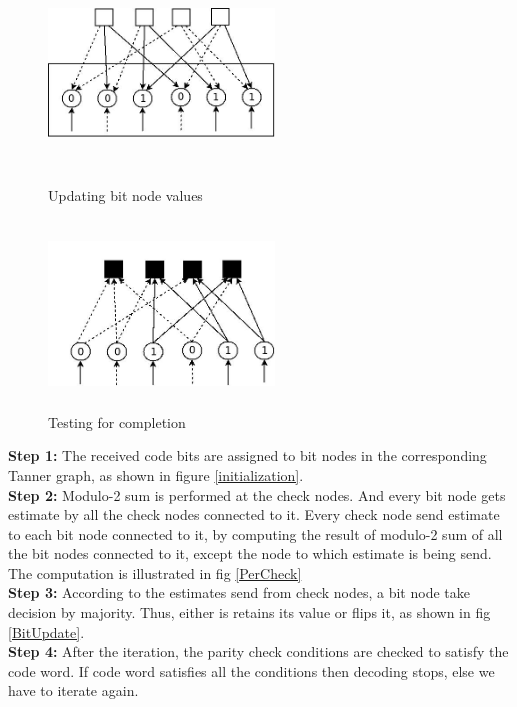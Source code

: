 \begin{figure}[h]
  \centering
  \begin{minipage}[b]{0.45\textwidth}
    \includegraphics[height=5cm,width=6cm]{BitUpdate}
    \caption[Updating bit node values]{ Updating bit node values }
    \label{BitUpdate}
  \end{minipage}
  \hspace{2mm}
  \begin{minipage}[b]{0.45\textwidth}
    \includegraphics[height=5cm,width=6cm]{Test}
    \caption[Testing for decoding completion]{Testing for completion}
    \label{Test}
  \end{minipage}
\end{figure} 

  
\textbf{Step 1:} The received code bits are assigned to bit nodes in the corresponding Tanner graph, as shown in figure \ref{initialization}. \\
\textbf{Step 2:} Modulo-2 sum is performed at the check nodes. And every bit node gets estimate by all the check nodes connected to it. Every check node send estimate to each bit node connected to it, by computing the result of modulo-2 sum of all the bit nodes connected to it, except the node to which estimate is being send. The computation is illustrated in fig \ref{PerCheck} \\
\textbf{Step 3:} According to the estimates send from check nodes, a bit node take decision by majority. Thus, either is retains its value or flips it, as shown in fig \ref{BitUpdate}.  \\
\textbf{Step 4:} After the iteration, the parity check conditions are checked to satisfy the code word. If code word satisfies all the conditions then decoding stops, else we have to iterate again. \\

